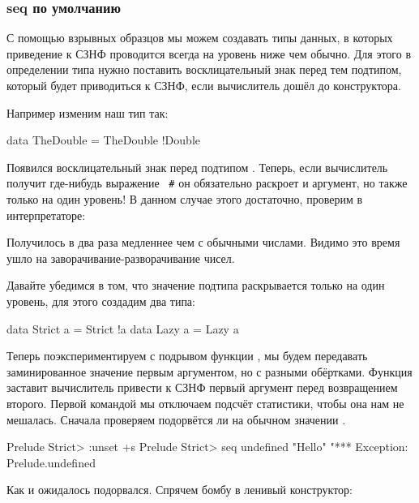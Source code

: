 \subsubsection{seq по умолчанию}

С помощью взрывных образцов мы можем создавать типы
данных, в которых приведение к СЗНФ проводится всегда
на уровень ниже чем обычно. Для этого в определении 
типа нужно поставить восклицательный знак перед тем 
подтипом, который будет приводиться к СЗНФ, если
вычислитель дошёл до конструктора. 

Например изменим наш тип  так:

\begin{code}
data TheDouble = TheDouble !Double
\end{code}

Появился восклицательный знак перед подтипом .
Теперь, если вычислитель получит где-нибудь выражение 
~\verb!#!\In{)} он обязательно раскроет и аргумент, но также
только на один уровень! В данном случае этого достаточно, 
проверим в интерпретаторе:


Получилось в два раза медленнее чем с обычными числами.
Видимо это время ушло на заворачивание-разворачивание 
чисел. 

Давайте убедимся в том, что значение подтипа раскрывается
только на один уровень, для этого создадим два типа:

\begin{code}
data Strict a = Strict !a
data Lazy   a = Lazy a
\end{code}

Теперь поэкспериментируем с подрывом функции , 
мы будем передавать заминированное значение первым аргументом,
но с разными обёртками. Функция  заставит вычислитель
привести к СЗНФ первый аргумент перед возвращением второго.
Первой командой мы отключаем подсчёт статистики, чтобы она нам
не мешалась. Сначала проверяем подорвётся ли  на
обычном значении . 

\begin{code}
Prelude Strict> :unset +s
Prelude Strict> seq undefined "Hello"
"*** Exception: Prelude.undefined
\end{code}


Как и ожидалось 
подорвался. Спрячем бомбу в ленивый конструктор:

